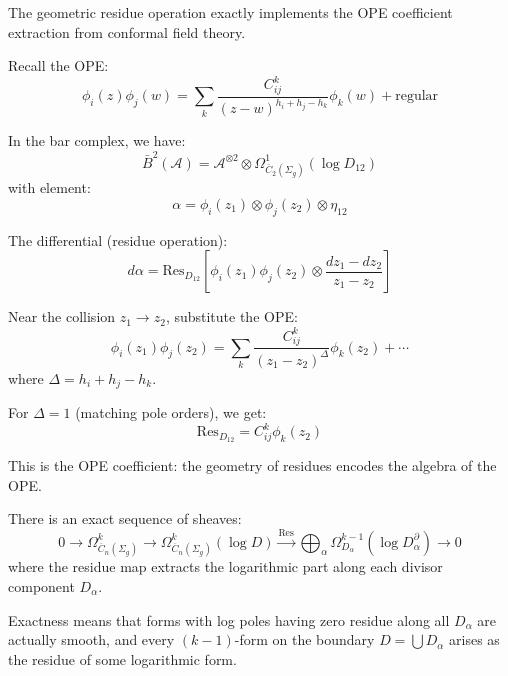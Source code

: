 \begin{remark}\label{rem:residues-and-ope}
The geometric residue operation exactly implements the OPE coefficient extraction from conformal field theory.

Recall the OPE:
\[\phi_i(z)\phi_j(w) = \sum_k \frac{C_{ij}^k}{(z-w)^{h_i+h_j-h_k}} \phi_k(w) + \text{regular}\]

In the bar complex, we have:
\[\bar{B}^2(\mathcal{A}) = \mathcal{A}^{\otimes 2} \otimes \Omega^1_{\overline{C}_2(\Sigma_g)}(\log D_{12})\]
with element:
\[\alpha = \phi_i(z_1) \otimes \phi_j(z_2) \otimes \eta_{12}\]

The differential (residue operation):
\[d\alpha = \text{Res}_{D_{12}}\left[\phi_i(z_1)\phi_j(z_2) \otimes \frac{dz_1 - dz_2}{z_1 - z_2}\right]\]

Near the collision $z_1 \to z_2$, substitute the OPE:
\[\phi_i(z_1)\phi_j(z_2) = \sum_k \frac{C_{ij}^k}{(z_1-z_2)^{\Delta}} \phi_k(z_2) + \cdots\]
where $\Delta = h_i + h_j - h_k$.

For $\Delta = 1$ (matching pole orders), we get:
\[\text{Res}_{D_{12}} = C_{ij}^k \phi_k(z_2)\]

This is the OPE coefficient: the geometry of residues encodes the algebra of the OPE.
\end{remark}

\begin{theorem}\label{thm:residue-sequence}
There is an exact sequence of sheaves:
\[0 \to \Omega^k_{\overline{C}_n(\Sigma_g)} \to \Omega^k_{\overline{C}_n(\Sigma_g)}(\log D) \xrightarrow{\text{Res}} \bigoplus_{\alpha} \Omega^{k-1}_{D_\alpha}(\log D_\alpha^\partial) \to 0\]
where the residue map extracts the logarithmic part along each divisor component $D_\alpha$.

Exactness means that forms with log poles having zero residue along all $D_\alpha$ are actually smooth, and every $(k-1)$-form on the boundary $D = \bigcup D_\alpha$ arises as the residue of some logarithmic form.
\end{theorem}

